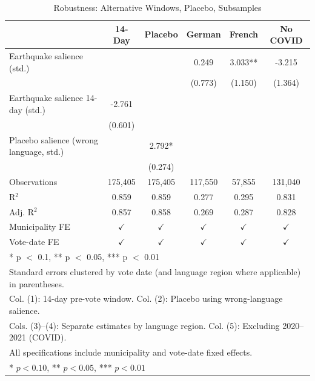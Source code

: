 \begin{table}
\centering
\caption{Robustness: Alternative Windows, Placebo, Subsamples \label{tab:robust}}
\centering\small
\begin{tabular}[t]{lccccc}
\toprule
  & 14-Day & Placebo & German & French & No COVID\\
\midrule
Earthquake salience (std.) &  &  & 0.249 & 3.033** & -3.215\\
 &  &  & (0.773) & (1.150) & (1.364)\\
Earthquake salience 14-day (std.) & -2.761 &  &  &  & \\
 & (0.601) &  &  &  & \\
Placebo salience (wrong language, std.) &  & 2.792* &  &  & \\
 &  & (0.274) &  &  & \\
\midrule
Observations & 175,405 & 175,405 & 117,550 & 57,855 & 131,040\\
R$^2$ & 0.859 & 0.859 & 0.277 & 0.295 & 0.831\\
Adj. R$^2$ & 0.857 & 0.858 & 0.269 & 0.287 & 0.828\\
Municipality FE & $\checkmark$ & $\checkmark$ & $\checkmark$ & $\checkmark$ & $\checkmark$\\
Vote-date FE & $\checkmark$ & $\checkmark$ & $\checkmark$ & $\checkmark$ & $\checkmark$\\
\bottomrule
\multicolumn{6}{p{0.85\textwidth}}{\rule{0pt}{1em}* p $<$ 0.1, ** p $<$ 0.05, *** p $<$ 0.01}\\
\multicolumn{6}{p{0.85\textwidth}}{\rule{0pt}{1em}Standard errors clustered by vote date (and language region where applicable) in parentheses.}\\
\multicolumn{6}{p{0.85\textwidth}}{\rule{0pt}{1em}Col. (1): 14-day pre-vote window. Col. (2): Placebo using wrong-language salience.}\\
\multicolumn{6}{p{0.85\textwidth}}{\rule{0pt}{1em}Cols. (3)--(4): Separate estimates by language region. Col. (5): Excluding 2020--2021 (COVID).}\\
\multicolumn{6}{p{0.85\textwidth}}{\rule{0pt}{1em}All specifications include municipality and vote-date fixed effects.}\\
\multicolumn{6}{p{0.85\textwidth}}{\rule{0pt}{1em}* $p<0.10$, ** $p<0.05$, *** $p<0.01$}\\
\end{tabular}
\end{table}
